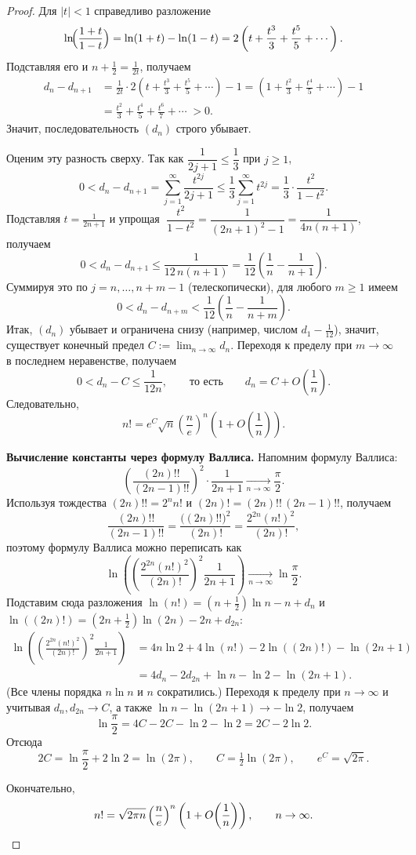 \begin{proof}
	Для $|t|<1$ справедливо разложение
	\[
	\ln\!\Bigl(\frac{1+t}{1-t}\Bigr)
	= \ln(1+t)-\ln(1-t)
	= 2\left(t+\frac{t^3}{3}+\frac{t^5}{5}+\cdots\right).
	\]
	Подставляя его и $n+\tfrac12=\frac1{2t}$, получаем
	\begin{align*}
		d_n-d_{n+1}
		&=\frac{1}{2t}\cdot 2\left(t+\frac{t^3}{3}+\frac{t^5}{5}+\cdots\right)-1
		=\left(1+\frac{t^2}{3}+\frac{t^4}{5}+\cdots\right)-1 \\
		&=\frac{t^2}{3}+\frac{t^4}{5}+\frac{t^6}{7}+\cdots\;>0.
	\end{align*}
	Значит, последовательность $(d_n)$ строго убывает.

	Оценим эту разность сверху. Так как $\dfrac{1}{2j+1}\le\dfrac13$ при $j\ge1$,
	\[
	0<d_n-d_{n+1}
	=\sum_{j=1}^{\infty}\frac{t^{2j}}{2j+1}
	\le \frac13\sum_{j=1}^{\infty} t^{2j}
	=\frac13\cdot \frac{t^2}{1-t^2}.
	\]
	Подставляя $t=\frac{1}{2n+1}$ и упрощая
	$\;\dfrac{t^2}{1-t^2}=\dfrac{1}{(2n+1)^2-1}=\dfrac{1}{4n(n+1)}$, получаем
	\[
	0<d_n-d_{n+1}
	\le \frac{1}{12\,n(n+1)}
	=\frac{1}{12}\left(\frac1n-\frac1{n+1}\right).
	\]
	Суммируя это по $j=n,\dots,n+m-1$ (телескопически), для любого $m\ge1$ имеем
	\[
	0<d_n-d_{n+m}
	<\frac{1}{12}\left(\frac1n-\frac1{n+m}\right).
	\]
	Итак, $(d_n)$ убывает и ограничена снизу (например, числом $d_1-\tfrac1{12}$),
	значит, существует конечный предел $C:=\lim_{n\to\infty} d_n$. Переходя к
	пределу при $m\to\infty$ в последнем неравенстве, получаем
	\[
	0<d_n-C\le \frac{1}{12n},
	\qquad\text{то есть}\qquad
	d_n=C+O\!\left(\frac1n\right).
	\]
	Следовательно,
	\[
	n!=e^{C}\sqrt{n}\left(\frac{n}{e}\right)^n\left(1+O\!\left(\frac1n\right)\right).
	\]

	\medskip
	\textbf{Вычисление константы через формулу Валлиса.}
	Напомним формулу Валлиса:
	\[
	\left(\frac{(2n)!!}{(2n-1)!!}\right)^2\cdot\frac{1}{2n+1}
	\xrightarrow[n\to\infty]{}\frac{\pi}{2}.
	\]
	Используя тождества $(2n)!!=2^n n!$ и $(2n)!=(2n)!!\,(2n-1)!!$, получаем
	\[
	\frac{(2n)!!}{(2n-1)!!}=\frac{\bigl((2n)!!\bigr)^2}{(2n)!}
	=\frac{2^{2n}(n!)^2}{(2n)!},
	\]
	поэтому формулу Валлиса можно переписать как
	\[
	\ln\!\left(\left(\frac{2^{2n}(n!)^2}{(2n)!}\right)^2\frac{1}{2n+1}\right)
	\xrightarrow[n\to\infty]{}\ln\frac{\pi}{2}.
	\]
	Подставим сюда разложения $\ln(n!)=(n+\tfrac12)\ln n-n+d_n$ и
	$\ln((2n)!)=(2n+\tfrac12)\ln(2n)-2n+d_{2n}$:
	\begin{align*}
		\ln\!\left(\left(\frac{2^{2n}(n!)^2}{(2n)!}\right)^2\frac{1}{2n+1}\right)
		&=4n\ln2+4\ln(n!)-2\ln((2n)!)-\ln(2n+1)\\
		&=4d_n-2d_{2n}+\ln n-\ln2-\ln(2n+1).
	\end{align*}
	(Все члены порядка $n\ln n$ и $n$ сократились.) Переходя к пределу при
	$n\to\infty$ и учитывая $d_n,d_{2n}\to C$, а также
	$\ln n-\ln(2n+1)\to-\ln2$, получаем
	\[
	\ln\frac{\pi}{2}=4C-2C-\ln2-\ln2=2C-2\ln2.
	\]
	Отсюда
	\[
	2C=\ln\frac{\pi}{2}+2\ln2=\ln(2\pi),
	\qquad
	C=\tfrac12\ln(2\pi),
	\qquad
	e^{C}=\sqrt{2\pi}.
	\]

	Окончательно,
	\[
	n!=\sqrt{2\pi n}\left(\frac{n}{e}\right)^n\left(1+O\!\left(\frac1n\right)\right),
	\qquad n\to\infty. \qedhere
	\]
\end{proof}
